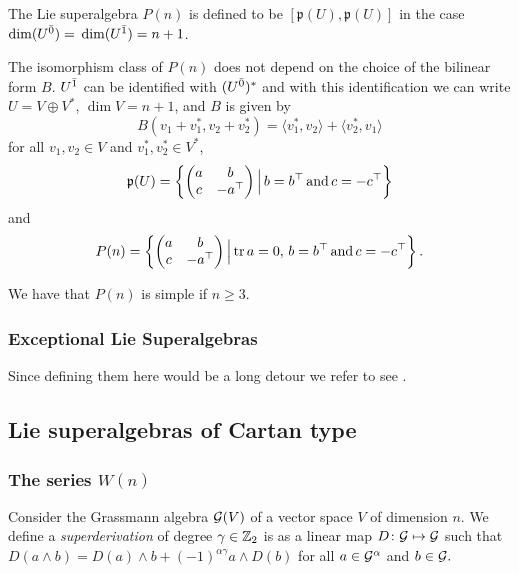 The Lie superalgebra $P(n)$ is defined to be $[\mathfrak{p}(U),\mathfrak{p}(U)]$ in the case \\ $\dim (U^{\bar0}) =$ $\dim (U^{\bar1}) = n+1$.

The isomorphism class of $P(n)$ does not depend on the choice of the bilinear form $B$. %
$U^{\bar1}$ can be identified with $(U^{\bar0})^*$ and with this identification we can write $U=V\oplus V^*$, $\operatorname{dim} V = n+1$, and $B$ is given by
\[B(v_1+v^*_1,v_2 + v_2^*) = \langle v_1^*, v_2\rangle + \langle v_2^*, v_1\rangle\] for all $v_1, v_2\in V$ and $v_1^*, v_2^*\in V^*$,%
%
%
\[\mathfrak{p}(U) = \left\{\left(\begin{matrix}
			a & b         \\
			c & -a^{\top} \\
		\end{matrix}
	\right) \Big| \, b=b^{\top} \,\text{and}\, c=-c^{\top}\right\}\]
% 
and
% 
\[P(n) = \left\{\left(\begin{matrix}
			a & b         \\
			c & -a^{\top} \\
		\end{matrix}
	\right)\Big| \operatorname{tr} a = 0,\, b=b^{\top} \,\text{and}\, c=-c^{\top}\right\}.\]

We have that $P(n)$ is simple if $n\geq 3$.

\subsubsection{Exceptional Lie Superalgebras} Since defining them here would be a long detour we refer to see \cite{artigokac}.

\subsection{Lie superalgebras of Cartan type}

\subsubsection{The series $W(n)$}
Consider the Grassmann algebra $\mathcal G(V)$ of a vector space $V$ of dimension $n$. We define a \emph{superderivation} of degree $\gamma\in\mathbb{Z}_{2}$ is as a linear map $D\colon \mathcal G \mapsto \mathcal G$ such that $D (a\wedge b)= D (a)\wedge b + (-1)^{\alpha\gamma} a\wedge D (b)$ for all $a \in \mathcal G^{\alpha}$ and $b\in \mathcal G.$

